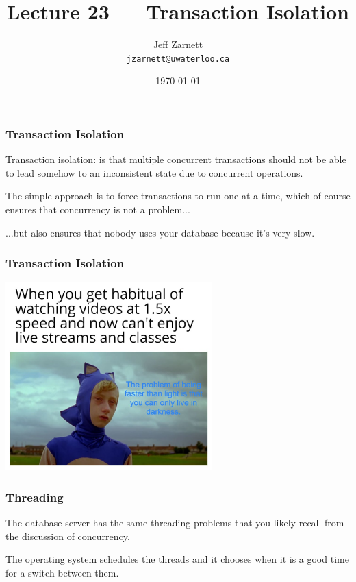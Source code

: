 

\title{Lecture 23 --- Transaction Isolation }

\author{Jeff Zarnett \\ \small \texttt{jzarnett@uwaterloo.ca}}
\date{\today}




\begin{frame}
  \titlepage

 \end{frame}



\begin{frame}
\frametitle{Transaction Isolation}
Transaction isolation: is that multiple concurrent transactions should not be able to lead somehow to an inconsistent state due to concurrent operations. 

The simple approach is to force transactions to run one at a time, which of course ensures that concurrency is not a problem... 

...but also ensures that nobody uses your database because it's very slow.

\end{frame}

\begin{frame}
\frametitle{Transaction Isolation}

\begin{center}
	\includegraphics[width=0.6\textwidth]{images/tooslow.jpg}
\end{center}

\end{frame}



\begin{frame}
\frametitle{Threading}

The database server has the same threading problems that you likely recall from the discussion of concurrency.

The operating system schedules the threads and it chooses when it is a good time for a switch between them.

\end{frame}

